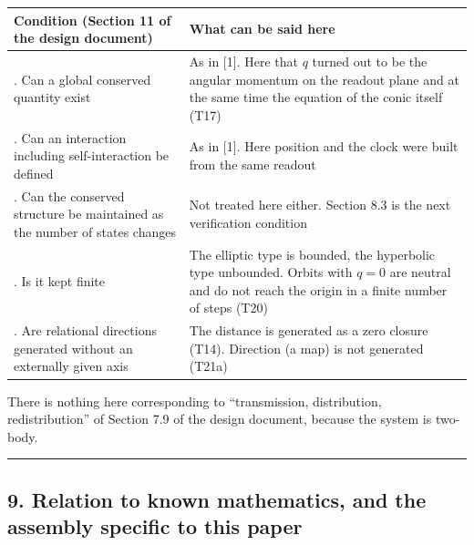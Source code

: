 \documentclass[
  a4paper,
]{article}
\newcounter{none} %
\begin{document}
{\def\LTcaptype{none} %
\begin{longtable}[]{@{}
  >{\raggedright\arraybackslash}p{}
  >{\raggedright\arraybackslash}p{}@{}}
\toprule\noalign{}
\begin{minipage}[b]{\linewidth}\raggedright
Condition (Section 11 of the design document)
\end{minipage} & \begin{minipage}[b]{\linewidth}\raggedright
What can be said here
\end{minipage} \\
\midrule\noalign{}
\endhead
\bottomrule\noalign{}
\endlastfoot
1. Can a global conserved quantity exist & As in {[}1{]}. Here that
\(q\) turned out to be the angular momentum on the readout plane and at
the same time the equation of the conic itself (T17) \\
2. Can an interaction including self-interaction be defined & As in
{[}1{]}. Here position and the clock were built from the same readout \\
3. Can the conserved structure be maintained as the number of states
changes & Not treated here either. Section 8.3 is the next verification
condition \\
4. Is it kept finite & The elliptic type is bounded, the hyperbolic type
unbounded. Orbits with \(q=0\) are neutral and do not reach the origin
in a finite number of steps (T20) \\
5. Are relational directions generated without an externally given axis
& The distance is generated as a zero closure (T14). Direction (a map)
is not generated (T21a) \\
\end{longtable}
}

There is nothing here corresponding to ``transmission, distribution,
redistribution'' of Section 7.9 of the design document, because the
system is two-body.

\begin{center}\rule{0.5\linewidth}{0.5pt}\end{center}

\subsection{9. Relation to known mathematics, and the assembly specific
to this
paper}\label{relation-to-known-mathematics-and-the-assembly-specific-to-this-paper}
\end{document}
